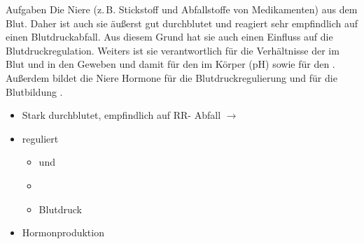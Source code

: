 \TextSlide
{Aufgaben}%
{%
Die Niere 
(z.\,B. Stickstoff und Abfallstoffe von Medikamenten) aus
dem Blut. Daher ist auch sie äußerst gut durchblutet und
reagiert sehr empfindlich auf einen Blutdruckabfall. Aus
diesem Grund hat sie auch einen Einfluss auf die
Blutdruckregulation.
Weiters ist sie verantwortlich für die Verhältnisse der
 im Blut und in den Geweben
und damit für den  im Körper (pH)
sowie für den .
Außerdem bildet die Niere Hormone für die
Blutdruckregulierung  und für die Blutbildung
.
}%
{
\begin{itemize}
  \item Stark durchblutet, empfindlich auf RR- Abfall ${\rightarrow}$
  \item reguliert
  \begin{itemize}
    \item {} und
    \item {}
    \item Blutdruck
  \end{itemize}
  \item Hormonproduktion
\end{itemize}}%



